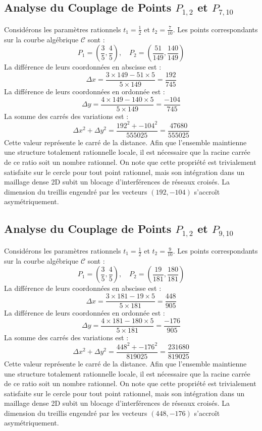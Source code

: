 \documentclass[12pt, a4paper]{article}
\begin{document}
\subsection{Analyse du Couplage de Points $P_{1,2}$ et $P_{7,10}$}
Considérons les paramètres rationnels $t_1 = \frac{1}{2}$ et $t_2 = \frac{7}{10}$.
Les points correspondants sur la courbe algébrique $\mathcal{C}$ sont :
$$ P_1 = \left( \frac{3}{5}, \frac{4}{5} \right), \quad P_2 = \left( \frac{51}{149}, \frac{140}{149} \right) $$
La différence de leurs coordonnées en abscisse est :
$$ \Delta x = \frac{3 \times 149 - 51 \times 5}{5 \times 149} = \frac{192}{745} $$
La différence de leurs coordonnées en ordonnée est :
$$ \Delta y = \frac{4 \times 149 - 140 \times 5}{5 \times 149} = \frac{-104}{745} $$
La somme des carrés des variations est :
$$ \Delta x^2 + \Delta y^2 = \frac{ 192^2 + -104^2 }{ 555025 } = \frac{ 47680 }{ 555025 } $$
Cette valeur représente le carré de la distance. Afin que l'ensemble maintienne une structure totalement rationnelle locale, il est nécessaire que la racine carrée de ce ratio soit un nombre rationnel. On note que cette propriété est trivialement satisfaite sur le cercle pour tout point rationnel, mais son intégration dans un maillage dense 2D subit un blocage d'interférences de réseaux croisés. La dimension du treillis engendré par les vecteurs $( 192, -104 )$ s'accroît asymétriquement.


\subsection{Analyse du Couplage de Points $P_{1,2}$ et $P_{9,10}$}
Considérons les paramètres rationnels $t_1 = \frac{1}{2}$ et $t_2 = \frac{9}{10}$.
Les points correspondants sur la courbe algébrique $\mathcal{C}$ sont :
$$ P_1 = \left( \frac{3}{5}, \frac{4}{5} \right), \quad P_2 = \left( \frac{19}{181}, \frac{180}{181} \right) $$
La différence de leurs coordonnées en abscisse est :
$$ \Delta x = \frac{3 \times 181 - 19 \times 5}{5 \times 181} = \frac{448}{905} $$
La différence de leurs coordonnées en ordonnée est :
$$ \Delta y = \frac{4 \times 181 - 180 \times 5}{5 \times 181} = \frac{-176}{905} $$
La somme des carrés des variations est :
$$ \Delta x^2 + \Delta y^2 = \frac{ 448^2 + -176^2 }{ 819025 } = \frac{ 231680 }{ 819025 } $$
Cette valeur représente le carré de la distance. Afin que l'ensemble maintienne une structure totalement rationnelle locale, il est nécessaire que la racine carrée de ce ratio soit un nombre rationnel. On note que cette propriété est trivialement satisfaite sur le cercle pour tout point rationnel, mais son intégration dans un maillage dense 2D subit un blocage d'interférences de réseaux croisés. La dimension du treillis engendré par les vecteurs $( 448, -176 )$ s'accroît asymétriquement.
\end{document}
